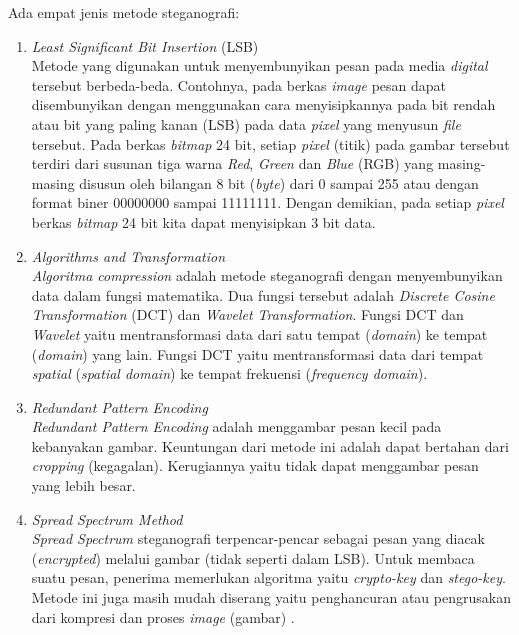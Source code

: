 	Ada empat jenis metode steganografi:
	\begin{enumerate}
		\item \emph{Least Significant Bit Insertion} (LSB)\\
		Metode yang digunakan untuk menyembunyikan pesan pada media \emph{digital} tersebut berbeda-beda. Contohnya, pada berkas \emph{image} pesan dapat disembunyikan dengan menggunakan cara menyisipkannya pada bit rendah atau bit yang paling kanan (LSB) pada data \emph{pixel} yang menyusun \emph{file} tersebut. Pada berkas \emph{bitmap} 24 bit, setiap \emph{pixel} (titik) pada gambar tersebut terdiri dari susunan tiga warna \emph{Red}, \emph{Green} dan \emph{Blue} (RGB) yang masing-masing disusun oleh bilangan 8 bit (\emph{byte}) dari 0 sampai 255 atau dengan format biner 00000000 sampai 11111111. Dengan demikian, pada setiap \emph{pixel} berkas \emph{bitmap} 24 bit kita dapat menyisipkan 3 bit data. 
		\item \emph{Algorithms and Transformation}\\
		\emph{Algoritma compression} adalah metode steganografi dengan menyembunyikan data dalam fungsi matematika. Dua fungsi tersebut adalah \emph{Discrete Cosine Transformation} (DCT) dan \emph{Wavelet Transformation}. Fungsi DCT dan \emph{Wavelet} yaitu mentransformasi data dari satu tempat (\emph{domain}) ke tempat (\emph{domain}) yang lain. Fungsi DCT yaitu mentransformasi data dari tempat \emph{spatial} (\emph{spatial domain}) ke tempat frekuensi (\emph{frequency domain}).
		\item \emph{Redundant Pattern Encoding}\\
		\emph{Redundant Pattern Encoding} adalah menggambar pesan kecil pada kebanyakan gambar. Keuntungan dari metode ini adalah dapat bertahan dari \emph{cropping} (kegagalan). Kerugiannya yaitu tidak dapat menggambar pesan yang lebih besar.
		\item \emph{Spread Spectrum Method}\\
		\emph{Spread Spectrum} steganografi terpencar-pencar sebagai pesan yang diacak (\emph{encrypted}) melalui gambar (tidak seperti dalam LSB). Untuk membaca suatu pesan, penerima memerlukan algoritma yaitu \emph{crypto-key} dan \emph{stego-key}. Metode ini juga masih mudah diserang yaitu penghancuran atau pengrusakan dari kompresi dan proses \emph{image} (gambar) \cite{wikipedia1}.
	\end{enumerate}

